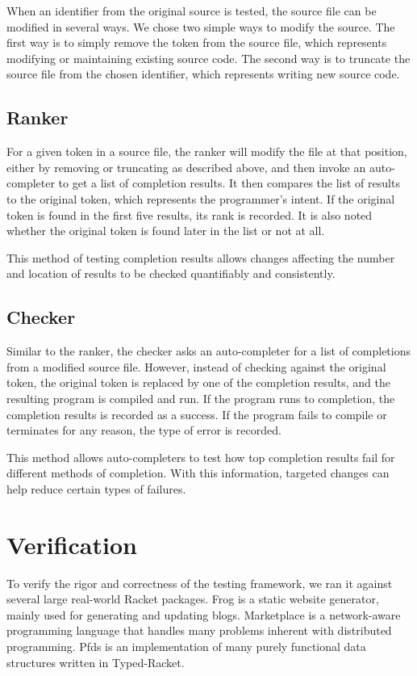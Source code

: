 \documentclass[ms,electronic,twosidetoc,letterpaper,chaptercenter,parttop,lol,lof,lot]{byumsphd}
\begin{document}
When an identifier from the original source is tested, the source file can be modified in
several ways. We chose two simple ways to modify the source. The first way is to simply
remove the token from the source file, which represents modifying or maintaining existing
source code. The second way is to truncate the source file from the chosen identifier,
which represents writing new source code.

\section{Ranker}

For a given token in a source file, the ranker will modify the file at that position,
either by removing or truncating as described above, and then invoke an auto-completer to
get a list of completion results. It then compares the list of results to the original
token, which represents the programmer's intent. If the original token is found in the
first five results, its rank is recorded. It is also noted whether the original token is
found later in the list or not at all.

This method of testing completion results allows changes affecting the number and location
of results to be checked quantifiably and consistently.

\section{Checker}

Similar to the ranker, the checker asks an auto-completer for a list of completions from a
modified source file. However, instead of checking against the original token, the
original token is replaced by one of the completion results, and the resulting program is
compiled and run. If the program runs to completion, the completion results is recorded as
a success. If the program fails to compile or terminates for any reason, the type of error
is recorded.

This method allows auto-completers to test how top completion results fail for different
methods of completion. With this information, targeted changes can help reduce certain
types of failures.

\chapter{Verification}

To verify the rigor and correctness of the testing framework, we ran it against several
large real-world Racket packages. Frog is a static website generator, mainly used for
generating and updating blogs. Marketplace is a network-aware programming language that
handles many problems inherent with distributed programming. Pfds is an implementation of
many purely functional data structures written in Typed-Racket.
\end{document}
